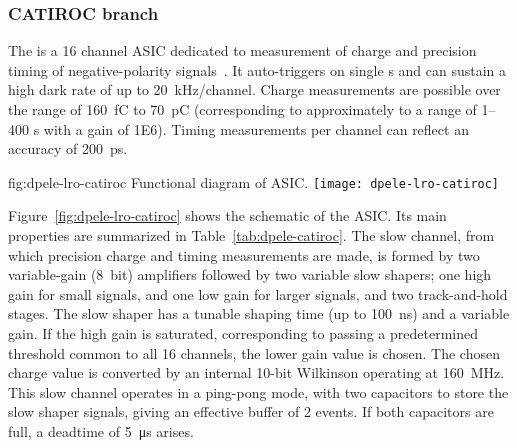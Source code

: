 \subsubsection{CATIROC branch} %

The  is a \num{16} channel ASIC dedicated to measurement of charge and precision timing of negative-polarity  signals~\cite{Blin:2017}. It auto-triggers on single \phel{}s and can sustain a high dark rate of up to \SI{20}{kHz/channel}. Charge measurements are possible over the range of \SI{160}{fC} to \SI{70}{pC} (corresponding to approximately to a range of \numrange{1}{400} \phel{}s with a  gain of \num{1E6}). Timing measurements per channel can %
reflect an accuracy of \SI{200}{ps}.

\begin{dunefigure}{fig:dpele-lro-catiroc}
{Functional diagram of  ASIC.}
\texttt{[image: dpele-lro-catiroc]}
\end{dunefigure}

Figure~\ref{fig:dpele-lro-catiroc} shows the schematic of the  ASIC. Its main properties are summarized in Table~\ref{tab:dpele-catiroc}. The slow channel, from which precision charge and timing measurements are made, is formed by two variable-gain (\SI{8}{bit}) amplifiers followed by two variable slow shapers; one high gain for small signals, and one low gain for larger signals, and two track-and-hold stages. The slow shaper has a tunable shaping time (up to \SI{100}{ns}) and a variable gain.  If the high gain is saturated, corresponding to passing a predetermined threshold common to all \num{16} channels, the lower gain value is chosen. The chosen charge value is converted by an internal 10-bit Wilkinson  operating at \SI{160}{MHz}.  This slow channel operates in a ping-pong mode, with two capacitors to store the slow shaper signals, giving an effective buffer of 2 events. If both capacitors are full, a deadtime of \SI{5}{\micro\second} arises.

